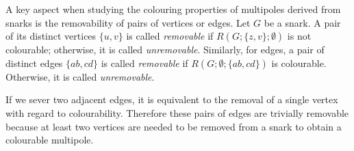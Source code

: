 A key aspect when studying the colouring properties of multipoles derived from snarks is the removability of pairs of vertices or edges.
	Let $G$ be a snark. A pair of its distinct vertices $\{u,v\}$ is called \textit{removable} if $R(G;\{z,v\};\emptyset)$ is not colourable; otherwise, it is called \textit{unremovable}. Similarly, for edges, a pair of distinct edges $\{ab,cd\}$ is called \textit{removable} if $R(G;\emptyset;\{ab,cd\})$ is colourable. Otherwise, it is called \textit{unremovable}.

If we sever two adjacent edges, it is equivalent to the removal of a single vertex with regard to colourability. Therefore these pairs of edges are trivially removable because at least two vertices are needed to be removed from a snark to obtain a colourable multipole.
